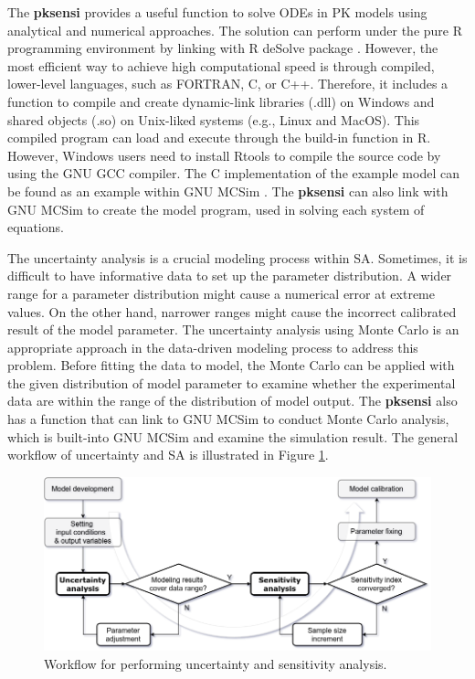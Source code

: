 \documentclass[preprint,12pt, a4paper]{elsarticle}
\begin{document}
The \textbf{pksensi} provides a useful function to solve ODEs
in PK models using analytical and numerical approaches. The solution can
perform under the pure R programming environment by linking
with R deSolve package \cite{JSSv033i09}.
However, the most efficient way to achieve high computational speed is
through compiled, lower-level languages, such as FORTRAN, C, or C++. 
Therefore, it includes a function to compile and create
dynamic-link libraries (.dll) on Windows and shared objects (.so) on
Unix-liked systems (e.g., Linux and MacOS). This compiled program can
load and execute through the build-in function in R. However, Windows
users need to install Rtools to compile the source code by using the GNU
GCC compiler. The C implementation of the example model can be found as
an example within GNU MCSim \cite{bois2009gnu}. The \textbf{pksensi}
can also link with GNU MCSim to create the model program, used in
solving each system of equations.

The uncertainty analysis is a crucial modeling process within SA.
Sometimes, it is difficult to have informative data to set up the
parameter distribution. A wider range for a parameter distribution might
cause a numerical error at extreme values. On the other hand, narrower
ranges might cause the incorrect calibrated result of the model
parameter. The uncertainty analysis using Monte Carlo is an appropriate
approach in the data-driven modeling process to address this problem.
Before fitting the data to model, the Monte Carlo can be applied with
the given distribution of model parameter to examine whether the
experimental data are within the range of the distribution of model
output. The \textbf{pksensi} also has a function that can link to GNU MCSim
to conduct Monte Carlo analysis, which is built-into GNU MCSim and
examine the simulation result. The general workflow of uncertainty and
SA is illustrated in Figure \ref{fig:workflow}.

\begin{figure}
\includegraphics[width=1\linewidth]{workflow} \caption{\label{fig:workflow}Workflow for performing uncertainty and sensitivity analysis.}\label{fig:workflow}
\end{figure}
\end{document}
